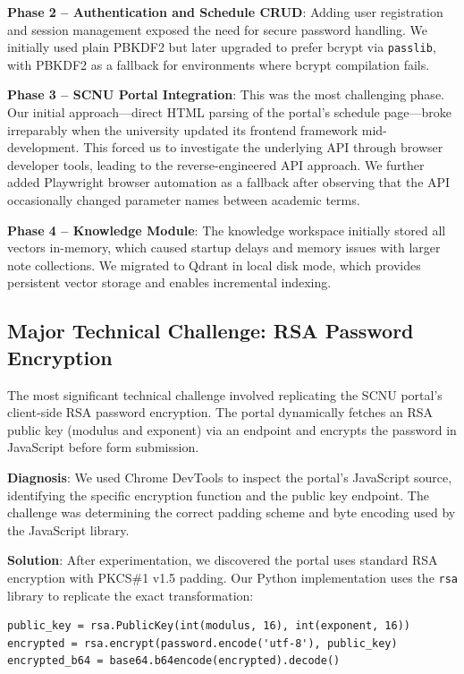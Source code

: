 \documentclass[11pt,a4paper]{article}
\begin{document}
\textbf{Phase 2 -- Authentication and Schedule CRUD}: Adding user registration and session management exposed the need for secure password handling. We initially used plain PBKDF2 but later upgraded to prefer bcrypt via \texttt{passlib}, with PBKDF2 as a fallback for environments where bcrypt compilation fails.

\textbf{Phase 3 -- SCNU Portal Integration}: This was the most challenging phase. Our initial approach---direct HTML parsing of the portal's schedule page---broke irreparably when the university updated its frontend framework mid-development. This forced us to investigate the underlying API through browser developer tools, leading to the reverse-engineered API approach. We further added Playwright browser automation as a fallback after observing that the API occasionally changed parameter names between academic terms.

\textbf{Phase 4 -- Knowledge Module}: The knowledge workspace initially stored all vectors in-memory, which caused startup delays and memory issues with larger note collections. We migrated to Qdrant in local disk mode, which provides persistent vector storage and enables incremental indexing.

\subsection{Major Technical Challenge: RSA Password Encryption}
The most significant technical challenge involved replicating the SCNU portal's client-side RSA password encryption. The portal dynamically fetches an RSA public key (modulus and exponent) via an endpoint and encrypts the password in JavaScript before form submission.

\textbf{Diagnosis}: We used Chrome DevTools to inspect the portal's JavaScript source, identifying the specific encryption function and the public key endpoint. The challenge was determining the correct padding scheme and byte encoding used by the JavaScript library.

\textbf{Solution}: After experimentation, we discovered the portal uses standard RSA encryption with PKCS\#1 v1.5 padding. Our Python implementation uses the \texttt{rsa} library to replicate the exact transformation:

\begin{verbatim}
public_key = rsa.PublicKey(int(modulus, 16), int(exponent, 16))
encrypted = rsa.encrypt(password.encode('utf-8'), public_key)
encrypted_b64 = base64.b64encode(encrypted).decode()
\end{verbatim}
\end{document}
